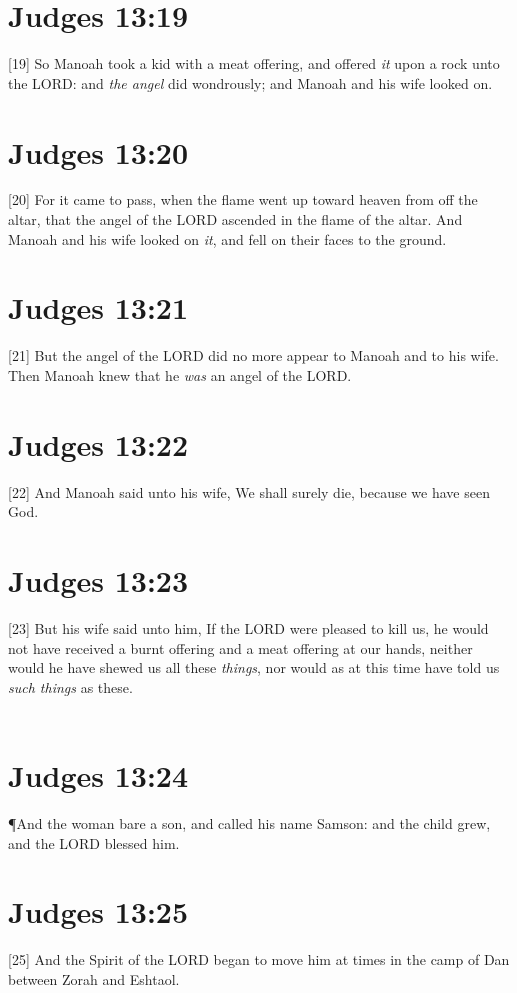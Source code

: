\section{Judges 13:19}
[19] \textcolor[rgb]{0.00,0.00,1.00}{So Manoah took a kid with a meat offering, and offered \emph{it} upon a rock unto the LORD: and \emph{the angel} did wondrously; and Manoah and his wife looked on.}
\section{Judges 13:20}
[20] \textcolor[rgb]{0.00,0.00,1.00}{For it came to pass, when the flame went up toward heaven from off the altar, that the angel of the LORD ascended in the flame of the altar. And Manoah and his wife looked on \emph{it}, and fell on their faces to the ground.}
\section{Judges 13:21}
[21] \textcolor[rgb]{0.00,0.00,1.00}{But the angel of the LORD did no more appear to Manoah and to his wife. Then Manoah knew that he \emph{was} an angel of the LORD.}
\section{Judges 13:22}
[22] \textcolor[rgb]{0.00,0.00,1.00}{And Manoah said unto his wife, We shall surely die, because we have seen God.}
\section{Judges 13:23}
[23] \textcolor[rgb]{0.00,0.00,1.00}{But his wife said unto him, If the LORD were pleased to kill us, he would not have received a burnt offering and a meat offering at our hands, neither would he have shewed us all these \emph{things}, nor would as at this time have told us \emph{such things} as these.}\\
\\
\section{Judges 13:24}
\P \textcolor[rgb]{0.00,0.00,1.00}{And the woman bare a son, and called his name Samson: and the child grew, and the LORD blessed him.}
\section{Judges 13:25}
[25] \textcolor[rgb]{0.00,0.00,1.00}{And the Spirit of the LORD began to move him at times in the camp of Dan between Zorah and Eshtaol.}
\newpage
